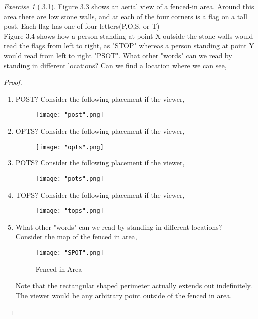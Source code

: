 \documentclass[12pt]{amsart}
\theoremstyle{remark}
\newtheorem*{exercise}{Exercise}%
\theoremstyle{mycomment}
\begin{document}
\thispagestyle{fancy}

\begin{exercise}[\bigcirc.3.1] 
Figure 3.3 shows an aerial view of a fenced-in area. Around this area there are low stone walls, and at each of the four corners is a flag on a tall post. Each flag has one of four letters(P,O,S, or T)\\


Figure 3.4 shows how a person standing at point X outside the stone walls would read the flags from left to right, as "STOP" whereas a person standing at point Y would read from left to right "PSOT". What other "words" can we read by standing in different locations? Can we find a location where we can see,

\begin{proof} 
\begin{enumerate}
\item POST?
Consider the following placement if the viewer, 
\begin{figure}[H]
\centering
\texttt{[image: "post".png]}
\end{figure}

\item OPTS?
Consider the following placement if the viewer, 
\begin{figure}[H]
\centering
\texttt{[image: "opts".png]}
\end{figure}

\item POTS?
Consider the following placement if the viewer, 
\begin{figure}[H]
\centering
\texttt{[image: "pots".png]}
\end{figure}

\item TOPS?
Consider the following placement if the viewer, 
\begin{figure}[H]
\centering
\texttt{[image: "tops".png]}
\end{figure}


\item What other "words" can we read by standing in different locations?\\
Consider the map of the fenced in area,

\begin{figure}[H]
\centering
\caption{Fenced in Area}
\texttt{[image: "SPOT".png]}
\end{figure}
Note that the rectangular shaped perimeter actually extends out indefinitely.
The viewer would be any arbitrary point outside of the fenced in area. \\


\end{enumerate}
\end{proof}
\end{exercise}
\end{document}
